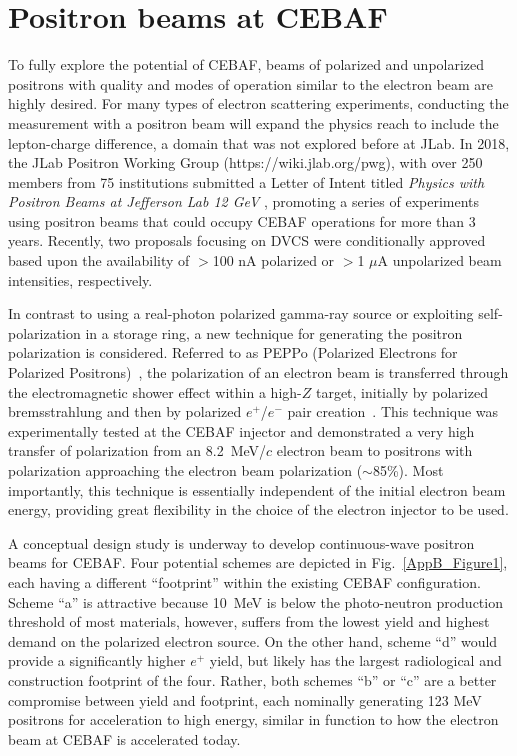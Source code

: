 \section{Positron beams at CEBAF} 
\label{sec:appendixb}
To fully explore the potential of CEBAF, beams of polarized and unpolarized positrons with quality and modes of operation similar to the electron beam are highly desired. For many types of electron scattering experiments, conducting the measurement with a positron beam will expand the physics reach to include the lepton-charge difference, a domain that was not explored before at JLab. 
In 2018, the JLab Positron Working Group (https://wiki.jlab.org/pwg), with over 250 members from 75 institutions submitted a Letter of Intent titled {\it Physics with Positron Beams at Jefferson Lab 12 GeV} \cite{afanasev2019physics}, promoting a series of experiments using positron beams that could occupy CEBAF operations for more than 3 years. Recently, two proposals focusing on DVCS were conditionally approved based upon the availability of $>$100 nA polarized or $>$1 $\mu$A unpolarized beam intensities, respectively. 

In contrast to using a real-photon polarized gamma-ray source or exploiting self-polarization in a storage ring, a new technique for generating the positron polarization is considered. Referred to as PEPPo (Polarized Electrons for Polarized Positrons)~\cite{PhysRevLett.116.214801}, the polarization of an electron beam is transferred through the electromagnetic shower effect within a high-$Z$ target, initially by polarized bremsstrahlung and then by polarized $e^+$/$e^-$ pair creation~\cite{POTYLITSIN1997395}. This technique was experimentally tested at the CEBAF injector and demonstrated a very high transfer of polarization from an 8.2~MeV/$c$ electron beam to positrons with polarization approaching the electron beam polarization ($\sim$85\%). Most importantly, this technique is essentially independent of the initial electron beam energy, providing great flexibility in the choice of the electron injector to be used.

A conceptual design study is underway to develop continuous-wave positron beams for CEBAF. Four potential schemes are depicted in Fig.~\ref{AppB_Figure1}, each having a different “footprint” within the existing CEBAF configuration. Scheme “a” is attractive because 10~MeV is below the photo-neutron production threshold of most materials, however, suffers from the lowest yield and highest demand on the polarized electron source.  On the other hand, scheme “d” would provide a significantly higher $e^+$ yield, but likely has the largest radiological and construction footprint of the four. Rather, both schemes “b” or “c” are a better compromise between yield and footprint, each nominally generating 123 MeV positrons for acceleration to high energy, similar in function to how the electron beam at CEBAF is accelerated today.

